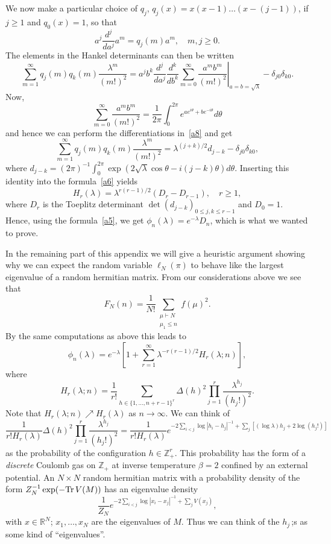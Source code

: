 \documentclass{amsart}
\theoremstyle{definition}
\theoremstyle{remark}
\numberwithin{equation}{section}
\begin{document}
We now make a particular choice of $q_j$, $q_j(x)=x(x-1)\dots (x-(j-1))$,
if $j\ge 1$ and $q_0(x)=1$, so that
\begin{equation}\label{a7}
a^j\frac {d^j}{da^j} a^m=q_j(m)a^m,\quad m,j\ge 0.
\end{equation}
The elements in the Hankel determinants can then be written
\begin{equation}\label{a8}
\left.\sum_{m=1}^\infty q_j(m)q_k(m)\frac{\lambda^m}{(m!)^2}=
a^jb^k\frac{d^j}{da^j}\frac{d^k}{db^k}\sum_{m=0}^\infty
\frac{a^mb^m}{(m!)^2}\right|_{a=b=\sqrt{\lambda}}-\delta_{j0}\delta_{k0}.
\end{equation}
Now,
$$
\sum_{m=0}^\infty\frac{a^mb^m}{(m!)^2}=\frac 1{2\pi}\int_0^{2\pi}
e^{ae^{i\theta}+be^{-i\theta}}d\theta
$$
and hence we can perform the differentiations in~\eqref{a8} and get
$$
\sum_{m=1}^\infty q_j(m)q_k(m)\frac{\lambda^m}{(m!)^2}=\lambda^{(j+k)/2}
d_{j-k}-\delta_{j0}\delta_{k0},
$$
where $d_{j-k}=(2\pi)^{-1}\int_0^{2\pi}\exp(2\sqrt{\lambda}\cos\theta-
i(j-k)\theta)d\theta$. Inserting this identity into 
the formula~\eqref{a6} yields
\begin{equation}\label{a9}
H_r(\lambda)=\lambda^{r(r-1)/2}(D_r-D_{r-1}), \quad r\ge 1,
\end{equation}
where $D_r$ is the Toeplitz determinant $\det(d_{j-k})_{0\le j,k\le r-1}$
and $D_0=1$. Hence, using the formula~\eqref{a5}, we get $\phi_n(\lambda)=
e^{-\lambda}D_n$, which is what we wanted to prove.
 
In the remaining part of this appendix we will give a heuristic argument 
showing why we can expect the random variable $\ell_N(\pi)$ to behave
like the largest eigenvalue of a random hermitian matrix. From our
considerations above we see that
$$
F_N(n)=\frac 1{N!}\sum_{\substack{\mu\vdash N \\ \mu_1\le n}} f(\mu)^2.
$$
By the same computations as above this leads to
\begin{equation}\label{a10}
\phi_n(\lambda)=e^{-\lambda}[1+\sum_{r=1}^\infty\lambda^{-r(r-1)/2}
H_r(\lambda;n)],
\end{equation}
where
$$
H_r(\lambda;n)=\frac 1{r!}\sum_{h\in\{1,\dots,n+r-1\}^r}\Delta(h)^2\prod_{j=1}^r
\frac{\lambda^{h_j}}{(h_j!)^2}.
$$
Note that $H_r(\lambda;n)\nearrow H_r(\lambda)$ as $n\to\infty$. We can think
of
\begin{equation}\label{a11}
\frac 1{r!H_r(\lambda)}\Delta(h)^2\prod_{j=1}^r
\frac{\lambda^{h_j}}{(h_j!)^2}=
\frac 1{r!H_r(\lambda)}e^{-2\sum_{i<j}\log|h_i-h_j|^{-1}+\sum_j
[(\log\lambda)h_j+2\log(h_j!)]}
\end{equation}
as the probability of the configuration 
$h\in\mathbb Z_+^r$. This probability has
the form of a {\it discrete} Coulomb gas 
on $\mathbb Z_+$ at inverse temperature 
$\beta=2$ confined by an external potential. An $N\times N$ random hermitian 
matrix with a probability density of the form 
$Z_N^{-1}\exp(-\text{Tr\,}V(M))$ has an eigenvalue density
$$
\frac 1{Z_N}e^{-2\sum_{i<j}\log|x_i-x_j|^{-1}+\sum_j V(x_j)},
$$
with $x\in\mathbb R^N$; $x_1,\dots ,x_N$ are the eigenvalues of $M$.
Thus we can think of the $h_j\,$;s as some kind of ``eigenvalues''.
 
\end{document}
